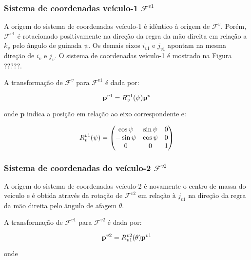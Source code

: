 \documentclass[a4paper, 12pt]{article}
\begin{document}
\subsubsection{Sistema de coordenadas veículo-1 $\mathcal{F}^{v1}$}

A origem do sistema de coordenadas veículo-1 é idêntico à origem de $\mathcal{F}^v$. Porém, $\mathcal{F}^{v1}$ é rotacionado positivamente na direção da regra da mão direita em relação a $k_v$ pelo ângulo de guinada $\psi$. Os demais eixos $i_{v1}$ e $j_{v1}$ apontam na mesma direção de $i_v$ e $j_v$. O sistema de coordenadas veículo-1 é mostrado na Figura ?????. 

A transformação de $\mathcal{F}^{v}$ para $\mathcal{F}^{v1}$ é dada por:

\begin{equation}
\centering
\mathbf{p}^{v1} = { R }_{ v }^{ v1 }(\psi)\mathbf{p}^{v}
\label{eq:coord1}
\end{equation}

\noindent onde $\mathbf{p}$ indica a posição em relação ao eixo correspondente e: 

\begin{equation}
\centering
{ R }_{ v }^{ v1 }(\psi) = 
\begin{pmatrix} 
\cos { \psi  }  & \sin { \psi  } & 0 \\ -\sin { \psi  }  & \cos { \psi  } & 0  \\ 0  & 0 & 1 
\end{pmatrix}
\label{eq:rotguinada}
\end{equation}

\subsubsection{Sistema de coordenadas do veículo-2 $\mathcal{F}^{v2}$}

A origem do sistema de coordenadas veículo-2 é novamente o centro de massa do veículo e é obtida através da rotação de $\mathcal{F}^{v2}$ em relação à $j_{v1}$ na direção da regra da mão direita pelo ângulo de afagem $\theta$. 

A transformação de $\mathcal{F}^{v1}$ para $\mathcal{F}^{v2}$ é dada por:

\begin{equation}
\centering
\mathbf{p}^{v2} = { R }_{ v1 }^{ v2 }(\theta)\mathbf{p}^{v1}
\label{eq:coord2}
\end{equation}

\noindent onde
\end{document}
